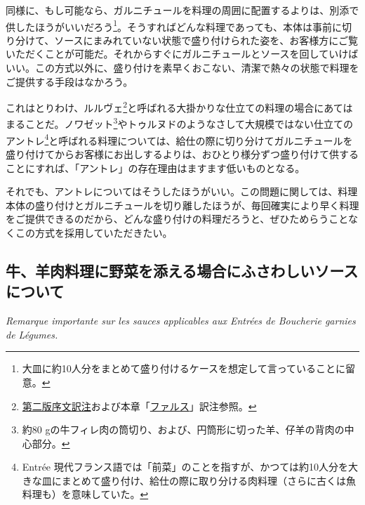 同様に、もし可能なら、ガルニチュールを料理の周囲に配置するよりは、別添で供したほうがいいだろう\footnote{大皿に約10人分をまとめて盛り付けるケースを想定して言っていることに留意。}。そうすればどんな料理であっても、本体は事前に切り分けて、ソースにまみれていない状態で盛り付けられた姿を、お客様方にご覧いただくことが可能だ。それからすぐにガルニチュールとソースを回していけばいい。この方式以外に、盛り付けを素早くおこない、清潔で熱々の状態で料理をご提供する手段はなかろう。

これはとりわけ、ルルヴェ\footnote{\protect\hyperlink{releve}{第二版序文訳注}および本章「\protect\hyperlink{farces}{ファルス}」訳注参照。}と呼ばれる大掛かりな仕立ての料理の場合にあてはまることだ。ノワゼット\footnote{約80
  gの牛フィレ肉の筒切り、および、円筒形に切った羊、仔羊の背肉の中心部分。}やトゥルヌドのようなさして大規模ではない仕立てのアントレ\footnote{Entrée
  現代フランス語では「前菜」のことを指すが、かつては約10人分を大きな皿にまとめて盛り付け、給仕の際に取り分ける肉料理（さらに古くは魚料理も）を意味していた。}と呼ばれる料理については、給仕の際に切り分けてガルニチュールを盛り付けてからお客様にお出しするよりは、おひとり様分ずつ盛り付けて供することにすれば、「アントレ」の存在理由はますます低いものとなる。

それでも、アントレについてはそうしたほうがいい。この問題に関しては、料理本体の盛り付けとガルニチュールを切り離したほうが、毎回確実により早く料理をご提供できるのだから、どんな盛り付けの料理だろうと、ぜひためらうことなくこの方式を採用していただきたい。

\hypertarget{remarque-importante-sur-les-sauces-applicables-aux-entrees-de-boucherie-garnie-de-legumes}{%
\subsection{牛、羊肉料理に野菜を添える場合にふさわしいソースについて}\label{remarque-importante-sur-les-sauces-applicables-aux-entrees-de-boucherie-garnie-de-legumes}}

\vspace{-1\zw}
\begin{center}
\textit{Remarque importante sur les sauces applicables aux Entrées de Boucherie garnies de Légumes.}
\end{center}


